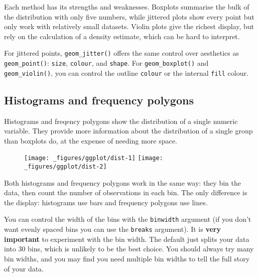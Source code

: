 Each method has its strengths and weaknesses. Boxplots summarise the
bulk of the distribution with only five numbers, while jittered plots
show every point but only work with relatively small datasets. Violin
plots give the richest display, but rely on the calculation of a density
estimate, which can be hard to interpret.

For jittered points, \texttt{geom\_jitter()} offers the same control
over aesthetics as \texttt{geom\_point()}: \texttt{size},
\texttt{colour}, and \texttt{shape}. For \texttt{geom\_boxplot()} and
\texttt{geom\_violin()}, you can control the outline \texttt{colour} or
the internal \texttt{fill} colour.

\subsection{Histograms and frequency polygons}\label{sub:distribution}

Histograms and freqency polygons show the distribution of a single
numeric variable. They provide more information about the distribution
of a single group than boxplots do, at the expense of needing more
space.  

\begin{Shaded}
\begin{Highlighting}[]
\StringTok{ }\NormalTok{()}
\StringTok{ }\NormalTok{()}
\end{Highlighting}
\end{Shaded}

\begin{figure}[H]
  \texttt{[image: \_figures/ggplot/dist-1]}%
  \texttt{[image: \_figures/ggplot/dist-2]}
\end{figure}

Both histograms and frequency polygons work in the same way: they bin
the data, then count the number of observations in each bin. The only
difference is the display: histograms use bars and frequency polygons
use lines.

You can control the width of the bins with the \texttt{binwidth}
argument (if you don't want evenly spaced bins you can use the
\texttt{breaks} argument). It is \textbf{very important} to experiment
with the bin width. The default just splits your data into 30 bins,
which is unlikely to be the best choice. You should always try many bin
widths, and you may find you need multiple bin widths to tell the full
story of your data.

